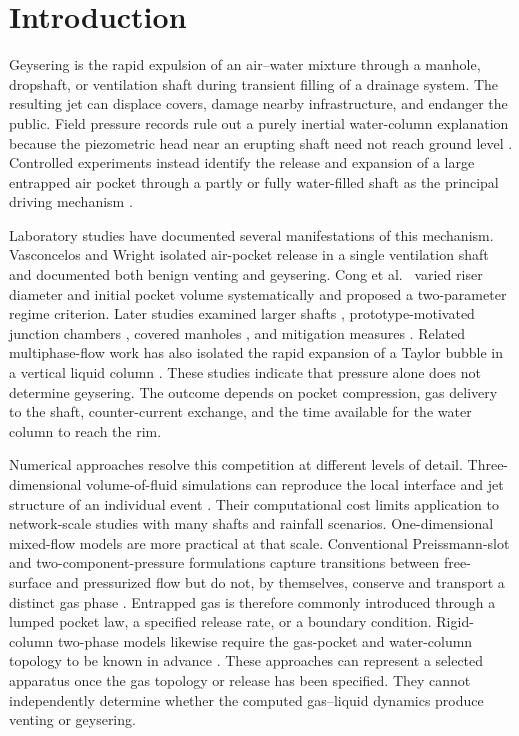\section{Introduction}
\label{sec:intro}

Geysering is the rapid expulsion of an air--water mixture through a manhole,
dropshaft, or ventilation shaft during transient filling of a drainage
system. The resulting jet can displace covers, damage nearby infrastructure,
and endanger the public. Field pressure records rule out a purely inertial
water-column explanation because the piezometric head near an erupting shaft
need not reach ground level \cite{wright2011note}. Controlled experiments
instead identify the release and expansion of a large entrapped air pocket
through a partly or fully water-filled shaft as the principal driving
mechanism \cite{vasconcelos2011,wright2011note}.

Laboratory studies have documented several manifestations of this mechanism.
Vasconcelos and Wright \cite{vasconcelos2011} isolated air-pocket release in
a single ventilation shaft and documented both benign venting and geysering.
Cong et al.\ \cite{cong2017} varied riser diameter and initial pocket volume
systematically and proposed a two-parameter regime criterion. Later studies
examined larger shafts \cite{muller2017}, prototype-motivated junction
chambers \cite{liu2020}, covered manholes \cite{zhang2022}, and mitigation
measures \cite{qian2020}. Related multiphase-flow work has also isolated the
rapid expansion of a Taylor bubble in a vertical liquid column
\cite{zhouprosperetti2019}. These studies indicate that pressure alone does not
determine geysering. The outcome depends on pocket compression, gas delivery to
the shaft, counter-current exchange, and the time available for the water
column to reach the rim.

Numerical approaches resolve this competition at different levels of detail.
Three-dimensional volume-of-fluid simulations can reproduce the local
interface and jet structure of an individual event \cite{chan2018}. Their
computational cost limits application to network-scale studies with many
shafts and rainfall scenarios. One-dimensional mixed-flow models are more
practical at that scale. Conventional Preissmann-slot and
two-component-pressure formulations capture transitions between free-surface
and pressurized flow but do not, by themselves, conserve and transport a
distinct gas phase \cite{vasconcelos2006}. Entrapped gas is therefore commonly
introduced through a lumped pocket law, a specified release rate, or a
boundary condition. Rigid-column two-phase models likewise require the
gas-pocket and water-column topology to be known in advance
\cite{vasconcelos2011}. These approaches can represent a selected apparatus
once the gas topology or release has been specified. They cannot independently
determine whether the computed gas--liquid dynamics produce venting or
geysering.

